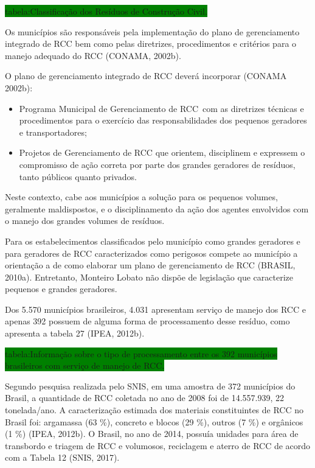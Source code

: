 	\colorbox{green}{tabela:Classificação dos Resíduos de Construção Civil.}
	
	Os municípios são responsáveis pela implementação do plano de gerenciamento integrado de RCC bem como pelas diretrizes, procedimentos e critérios para o manejo adequado do RCC (CONAMA, 2002b). 
	
	O plano de gerenciamento integrado de RCC deverá incorporar (CONAMA 2002b):
	
	\begin{itemize}
		\item Programa Municipal de Gerenciamento de RCC com as diretrizes técnicas e procedimentos para o exercício das responsabilidades dos pequenos geradores e transportadores;
		\item Projetos de Gerenciamento de RCC que orientem, disciplinem e expressem o compromisso de ação correta por parte dos grandes geradores de resíduos, tanto públicos quanto privados.
	\end{itemize}

	Neste contexto, cabe aos municípios a solução para os pequenos volumes, geralmente maldispostos, e o disciplinamento da ação dos agentes envolvidos com o manejo dos grandes volumes de resíduos.

	Para os estabelecimentos classificados pelo município como grandes geradores e para geradores de RCC caracterizados como perigosos compete ao município a orientação a de como elaborar um plano de gerenciamento de RCC (BRASIL, 2010a). Entretanto, Monteiro Lobato não dispõe de legislação que caracterize pequenos e grandes geradores.

	Dos 5.570 municípios brasileiros, 4.031 apresentam serviço de manejo dos RCC e apenas 392 possuem de alguma forma de processamento desse resíduo, como apresenta a tabela 27 (IPEA, 2012b). 
	
	\colorbox{green}{tabela:Informação sobre o tipo de processamento entre os 392 municípios brasileiros com serviço de manejo de RCC.}
	
	Segundo pesquisa realizada pelo SNIS, em uma amostra de 372 municípios do Brasil, a quantidade de RCC coletada no ano de 2008 foi de 14.557.939, 22 tonelada/ano. A caracterização estimada dos materiais constituintes de RCC no Brasil foi: argamassa (63 \%), concreto e blocos (29 \%), outros (7 \%) e orgânicos (1 \%) (IPEA, 2012b). O Brasil, no ano de 2014, possuía unidades para área de transbordo e triagem de RCC e volumosos, reciclagem e aterro de RCC de acordo com a Tabela 12 (SNIS, 2017). 
	
